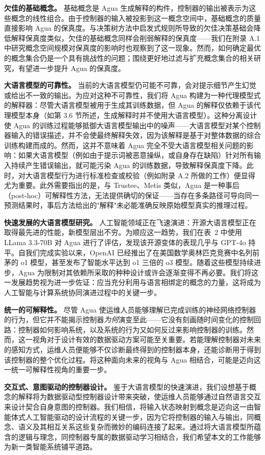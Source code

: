 \documentclass[11pt,a4paper]{article}
\begin{document}
\textbf{欠佳的基础概念。} 基础概念是 Agua 生成解释的构件，控制器的输出被表示为这些概念的线性组合。由于控制器的输入被投影到这一概念空间中，基础概念的质量直接影响 Agua 的保真度。与决策树方法中启发式规则所导致的欠佳决策基础会降低解释保真度类似，欠佳的基础概念同样会削弱解释的保真度——我们在附录 A.1 中研究概念空间规模对保真度的影响时也观察到了这一现象。然而，如何确定最优的概念集合仍是一个具有挑战性的问题；围绕更好地过滤与扩充概念集合的相关研究，有望进一步提升 Agua 的保真度。

\textbf{大语言模型的可靠性。} 当前的大语言模型仍可能不可靠，会对提示细节产生幻觉或给出不一致的输出。为应对这种不可靠性，我们将 Agua 构建为一种代理模型式的解释器：尽管大语言模型被用于生成其训练数据，但 Agua 的解释仅依赖于该代理模型本身（如第 3.6 节所述，生成解释时并不使用大语言模型）。这种分离设计使 Agua 的训练过程能够抵御大语言模型输出中的噪声——大语言模型对某个控制器输入的错误描述，并不会使最终解释失效，因为该解释是基于对整体数据的综合训练构建而成的。然而，这并不意味着 Agua 完全不受大语言模型相关问题的影响：如果大语言模型（例如由于提示词被恶意操纵，或自身存在缺陷）针对所有输入持续产生错误输出，就可能污染 Agua 的训练数据，导致解释保真度下降。此时，对大语言模型行为进行标准检查或校验（例如附录 A.2 所做的工作）便显得尤为重要。此外需要指出的是，与 Trustee、Metis 类似，Agua 是一种事后（post-hoc）可解释性方法，无法提供确切的保证——当存在多条路径可导向同一预测结果时，事后方法给出的"解释"未必能准确反映原始模型真实的推理过程。

\textbf{快速发展的大语言模型研究。} 人工智能领域正在飞速演进：开源大语言模型正在取得最先进的性能，新模型层出不穷。为顺应这一趋势，我们在表~2 中使用 LLama 3.3-70B 对 Agua 进行了评估，发现该开源变体的表现几乎与 GPT-4o 持平。自我们完成实验以来，OpenAI 已经推出了在美国数学奥林匹克竞赛中名列前茅的 o1 模型，甚至发布了智能水平达到 o1 三倍的 o3 模型。随着这些模型持续进步，Agua 为限制对其依赖所采取的种种设计或许会逐渐变得不再必要。我们将这一发展趋势视为进一步佐证：应当充分利用与语言相绑定的概念的力量，这将成为人工智能与计算系统协同演进过程中的关键一步。

\textbf{统一的可解释性。} 尽管 Agua 使运维人员能够理解已完成训练的神经网络控制器的行为，但它并不能揭示控制器\emph{为何}演变至此——它没有刻画随时间变化的控制回路：控制器如何影响系统，以及系统的行为又如何反过来影响控制器的训练。然而，这一视角对于设计有效的数据驱动方案可能至关重要。若能理解控制器对未来的感知方式，运维人员便能够不仅诊断最终得到的控制器本身，还能诊断用于得到该控制器的整个优化过程。将这种面向未来的视角与 Agua 相结合，可能是迈向这一统一可解释性视角的重要一步。

\textbf{交互式、意图驱动的控制器设计。} 鉴于大语言模型的快速演进，我们设想基于概念的解释将为数据驱动型控制器设计带来突破，使运维人员能够通过自然语言交互来设计契合自身意图的控制器。我们相信，将输入状态映射到概念是迈向这一由智能体式人工智能驱动的设计流程的关键一步，因为它将控制器的输入与输出，同概念、语义及其相互关系这些复杂而微妙的编码连接了起来。通过将大语言模型所蕴含的逻辑与理念，同控制器专属的数据驱动学习相结合，我们希望本文的工作能够为新一类智能系统铺平道路。
\end{document}
